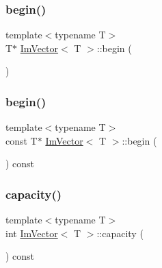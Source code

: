 \mbox{\label{structImVector_a470909b2720bc5cb71ec023439e9c814}} 
\subsubsection{\texorpdfstring{begin()}{begin()}\hspace{0.1cm}{\footnotesize\ttfamily [1/2]}}
{\footnotesize\ttfamily template$<$typename T$>$ \\
T$\ast$ \hyperlink{structImVector}{Im\+Vector}$<$ T $>$\+::begin (\begin{DoxyParamCaption}{ }\end{DoxyParamCaption})\hspace{0.3cm}{\ttfamily [inline]}}

\mbox{\label{structImVector_a05442a30c96197c24d17e736cd2a68b2}} 
\subsubsection{\texorpdfstring{begin()}{begin()}\hspace{0.1cm}{\footnotesize\ttfamily [2/2]}}
{\footnotesize\ttfamily template$<$typename T$>$ \\
const T$\ast$ \hyperlink{structImVector}{Im\+Vector}$<$ T $>$\+::begin (\begin{DoxyParamCaption}{ }\end{DoxyParamCaption}) const\hspace{0.3cm}{\ttfamily [inline]}}

\mbox{\label{structImVector_ac17681baa8b9b5cd97e556da29f9ef73}} 
\subsubsection{\texorpdfstring{capacity()}{capacity()}}
{\footnotesize\ttfamily template$<$typename T$>$ \\
int \hyperlink{structImVector}{Im\+Vector}$<$ T $>$\+::capacity (\begin{DoxyParamCaption}{ }\end{DoxyParamCaption}) const\hspace{0.3cm}{\ttfamily [inline]}}

